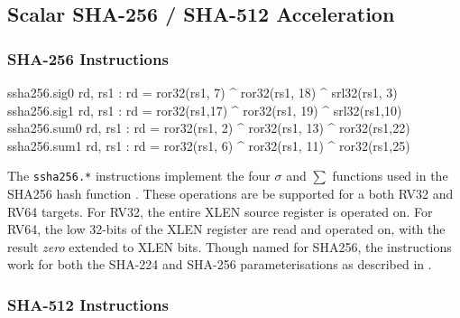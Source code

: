 
\newpage
\subsection{Scalar SHA-256 / SHA-512 Acceleration}
\label{sec:scalar:sha2}

\subsubsection{SHA-256 Instructions}

\begin{cryptoisa}
ssha256.sig0 rd, rs1 : rd = ror32(rs1, 7) ^ ror32(rs1, 18) ^ srl32(rs1, 3)
ssha256.sig1 rd, rs1 : rd = ror32(rs1,17) ^ ror32(rs1, 19) ^ srl32(rs1,10)
ssha256.sum0 rd, rs1 : rd = ror32(rs1, 2) ^ ror32(rs1, 13) ^ ror32(rs1,22)
ssha256.sum1 rd, rs1 : rd = ror32(rs1, 6) ^ ror32(rs1, 11) ^ ror32(rs1,25)
\end{cryptoisa}

The {\tt ssha256.*}
instructions implement the four $\sigma$ and $\sum$ functions used in
the SHA256 hash function \cite[Section 4.1.2]{nist:fips:180:4}.
These operations are be supported for a both RV32 and RV64 targets.
For RV32, the entire XLEN source register is operated on.
For RV64, the low 32-bits of the XLEN register are read and operated on,
with the result {\em zero} extended to XLEN bits.
Though named for SHA256, the instructions work for both the
SHA-224 and SHA-256 parameterisations as described in
\cite{nist:fips:180:4}.

\subsubsection{SHA-512 Instructions}

